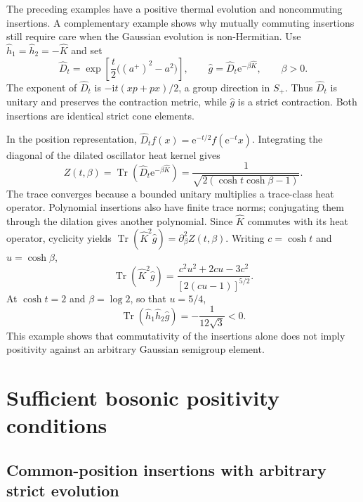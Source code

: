 \documentclass[11pt,a4paper]{article}
\newcommand{\Tr}{\operatorname{Tr}}
\newcommand{\ee}{\mathrm e}
\newcommand{\ii}{\mathrm i}
\theoremstyle{remark}
\numberwithin{equation}{section}
\begin{document}
The preceding examples have a positive thermal evolution and noncommuting
insertions. A complementary example shows why mutually commuting insertions
still require care when the Gaussian evolution is non-Hermitian. Use
\(\hat h_1=\hat h_2=-\hat K\) and set
\begin{equation}
\hat D_t=\exp\!\left[\frac t2\bigl((a^+)^2-a^2\bigr)\right],
\qquad \hat g=\hat D_t\ee^{-\beta\hat K},\qquad \beta>0.
\label{eq:dilation_example}
\end{equation}
The exponent of \(\hat D_t\) is
\(-\ii t(xp+px)/2\), a group direction in \(S_+\). Thus \(\hat D_t\)
is unitary and preserves the contraction metric, while \(\hat g\) is a
strict contraction. Both insertions are identical strict cone elements.

In the position representation,
\(\hat D_t f(x)=\ee^{-t/2}f(\ee^{-t}x)\). Integrating the diagonal of
the dilated oscillator heat kernel gives
\begin{equation}
Z(t,\beta)=\Tr(\hat D_t\ee^{-\beta\hat K})
=\frac1{\sqrt{2(\cosh t\cosh\beta-1)}}.
\label{eq:dilated_partition}
\end{equation}
The trace converges because a bounded unitary multiplies a trace-class heat
operator. Polynomial insertions also have finite trace norms; conjugating
them through the dilation gives another polynomial. Since \(\hat K\)
commutes with its heat operator, cyclicity yields
\(\Tr(\hat K^2\hat g)=\partial_\beta^2 Z(t,\beta)\). Writing
\(c=\cosh t\) and \(u=\cosh\beta\),
\begin{equation}
\Tr(\hat K^2\hat g)
=\frac{c^2u^2+2cu-3c^2}{[2(cu-1)]^{5/2}}.
\label{eq:dilated_second_derivative}
\end{equation}
At \(\cosh t=2\) and \(\beta=\log2\), so that \(u=5/4\),
\begin{equation}
\boxed{\Tr(\hat h_1\hat h_2\hat g)=-\frac1{12\sqrt3}<0.}
\label{eq:commuting_negative}
\end{equation}
This example shows that commutativity of the insertions alone does not imply
positivity against an arbitrary Gaussian semigroup element.

\section{Sufficient bosonic positivity conditions}
\label{sec:boson_positive}

\subsection{Common-position insertions with arbitrary strict evolution}
\end{document}
